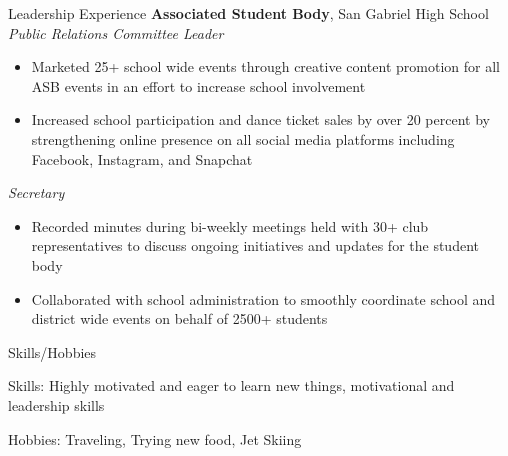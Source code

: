 \documentclass{resume}
\begin{document}
\begin{rSection}{Leadership Experience}
\textbf{Associated Student Body}, San Gabriel High School\\
\textit{Public Relations Committee Leader}
\begin{itemize}
    \item Marketed 25+ school wide events through creative content promotion for all ASB events in an effort to increase school involvement
    \item Increased school participation and dance ticket sales by over 20 percent by strengthening online presence on all social media platforms including Facebook, Instagram, and Snapchat
\end{itemize}
\textit{Secretary}
\begin{itemize}
    \item Recorded minutes during bi-weekly meetings held with 30+ club representatives to discuss ongoing initiatives and updates for the student body
    \item Collaborated with school administration to smoothly coordinate school and district wide events on behalf of 2500+ students
\end{itemize}
\end{rSection}

\begin{rSection}{Skills/Hobbies}
\item Skills: Highly motivated and eager to learn new things,  motivational and leadership skills
\item Hobbies: Traveling, Trying new food, Jet Skiing
\end{rSection}
\end{document}
